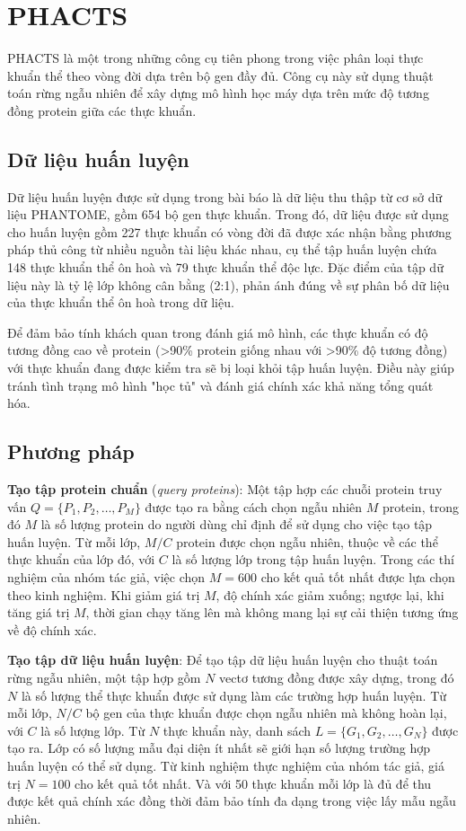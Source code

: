\section{PHACTS}

PHACTS\cite{mcnair2012phacts} là một trong những công cụ tiên phong trong việc phân loại thực khuẩn thể theo vòng đời dựa trên bộ gen đầy đủ. Công cụ này sử dụng thuật toán rừng ngẫu nhiên để xây dựng mô hình học máy dựa trên mức độ tương đồng protein giữa các thực khuẩn.

\subsection*{Dữ liệu huấn luyện}
Dữ liệu huấn luyện được sử dụng trong bài báo là dữ liệu thu thập từ cơ sở dữ liệu PHANTOME, gồm 654 bộ gen thực khuẩn. Trong đó, dữ liệu được sử dụng cho huấn luyện gồm 227 thực khuẩn có vòng đời đã được xác nhận bằng phương pháp thủ công từ nhiều nguồn tài liệu khác nhau, cụ thể tập huấn luyện chứa 148 thực khuẩn thể ôn hoà và 79 thực khuẩn thể độc lực. Đặc điểm của tập dữ liệu này là tỷ lệ lớp không cân bằng (2:1), phản ánh đúng về sự phân bố dữ liệu của thực khuẩn thể ôn hoà trong dữ liệu.

Để đảm bảo tính khách quan trong đánh giá mô hình, các thực khuẩn có độ tương đồng cao về protein (>90\% protein giống nhau với >90\% độ tương đồng) với thực khuẩn đang được kiểm tra sẽ bị loại khỏi tập huấn luyện. Điều này giúp tránh tình trạng mô hình "học tủ" và đánh giá chính xác khả năng tổng quát hóa.

\subsection*{Phương pháp}

\textbf{Tạo tập protein chuẩn} (\textit{query proteins}): Một tập hợp các chuỗi protein truy vấn \( Q = \{P_1, P_2, \ldots, P_M\} \) được tạo ra bằng cách chọn ngẫu nhiên \( M \) protein, trong đó \( M \) là số lượng protein do người dùng chỉ định để sử dụng cho việc tạo tập huấn luyện. Từ mỗi lớp, \( M/C \) protein được chọn ngẫu nhiên, thuộc về các thể thực khuẩn của lớp đó, với \( C \) là số lượng lớp trong tập huấn luyện. Trong các thí nghiệm của nhóm tác giả, việc chọn \( M = 600 \) cho kết quả tốt nhất được lựa chọn theo kinh nghiệm. Khi giảm giá trị \( M \), độ chính xác giảm xuống; ngược lại, khi tăng giá trị \( M \), thời gian chạy tăng lên mà không mang lại sự cải thiện tương ứng về độ chính xác.

\textbf{Tạo tập dữ liệu huấn luyện}: Để tạo tập dữ liệu huấn luyện cho thuật toán rừng ngẫu nhiên, một tập hợp gồm \( N \) vectơ tương đồng được xây dựng, trong đó \( N \) là số lượng thể thực khuẩn được sử dụng làm các trường hợp huấn luyện. Từ mỗi lớp, \( N/C \) bộ gen của thực khuẩn được chọn ngẫu nhiên mà không hoàn lại, với \( C \) là số lượng lớp. Từ \( N \) thực khuẩn này, danh sách \( L = \{G_1, G_2, \ldots, G_N\} \) được tạo ra. Lớp có số lượng mẫu đại diện ít nhất sẽ giới hạn số lượng trường hợp huấn luyện có thể sử dụng. Từ kinh nghiệm thực nghiệm của nhóm tác giả, giá trị \( N = 100 \) cho kết quả tốt nhất. Và với 50 thực khuẩn mỗi lớp là đủ để thu được kết quả chính xác đồng thời đảm bảo tính đa dạng trong việc lấy mẫu ngẫu nhiên. 

